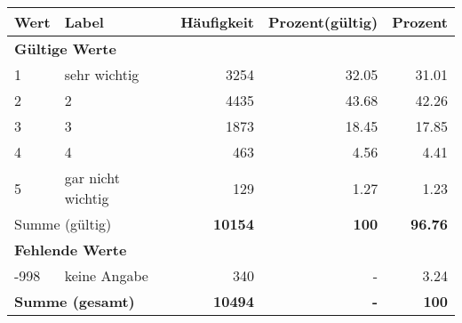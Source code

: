      \begin{longtable}{lXrrr}
     \toprule
     \textbf{Wert} & \textbf{Label} & \textbf{Häufigkeit} & \textbf{Prozent(gültig)} & \textbf{Prozent} \\
     \endhead
     \midrule
     \multicolumn{5}{l}{\textbf{Gültige Werte}}\\

     1 &
     \multicolumn{1}{X}{ sehr wichtig   } &


       \num{3254} &
       \num[round-mode=places,round-precision=2]{32.05} &
         \num[round-mode=places,round-precision=2]{31.01} \\

     2 &
     \multicolumn{1}{X}{ 2   } &


       \num{4435} &
       \num[round-mode=places,round-precision=2]{43.68} &
         \num[round-mode=places,round-precision=2]{42.26} \\

     3 &
     \multicolumn{1}{X}{ 3   } &


       \num{1873} &
       \num[round-mode=places,round-precision=2]{18.45} &
         \num[round-mode=places,round-precision=2]{17.85} \\

     4 &
     \multicolumn{1}{X}{ 4   } &


       \num{463} &
       \num[round-mode=places,round-precision=2]{4.56} &
         \num[round-mode=places,round-precision=2]{4.41} \\

     5 &
     \multicolumn{1}{X}{ gar nicht wichtig   } &


       \num{129} &
       \num[round-mode=places,round-precision=2]{1.27} &
         \num[round-mode=places,round-precision=2]{1.23} \\
     \midrule
     \multicolumn{2}{l}{Summe (gültig)} &
       \textbf{\num{10154}} &
     \textbf{\num{100}} &
       \textbf{\num[round-mode=places,round-precision=2]{96.76}} \\
     \multicolumn{5}{l}{\textbf{Fehlende Werte}}\\
       -998 &
       keine Angabe &
         \num{340} &
        - &
         \num[round-mode=places,round-precision=2]{3.24} \\
     \midrule
     \multicolumn{2}{l}{\textbf{Summe (gesamt)}} &
          \textbf{\num{10494}} &
        \textbf{-} &
        \textbf{\num{100}} \\
     \bottomrule
     \end{longtable}
     
